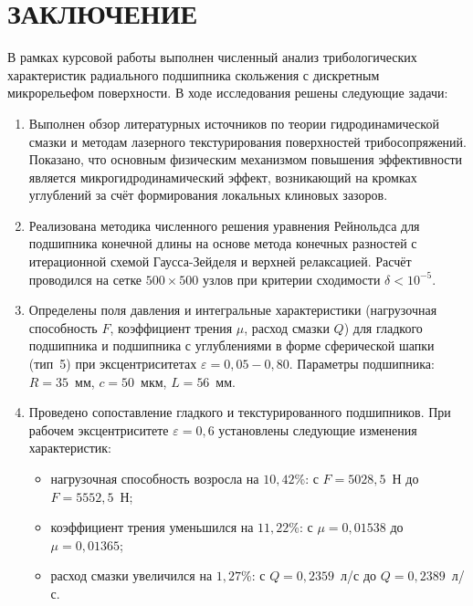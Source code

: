 \section*{ЗАКЛЮЧЕНИЕ}
{}

В рамках курсовой работы выполнен численный анализ трибологических характеристик радиального подшипника скольжения с дискретным микрорельефом поверхности. В ходе исследования решены следующие задачи:

\begin{enumerate}
    \item Выполнен обзор литературных источников по теории гидродинамической смазки и методам лазерного текстурирования поверхностей трибосопряжений. Показано, что основным физическим механизмом повышения эффективности является микрогидродинамический эффект, возникающий на кромках углублений за счёт формирования локальных клиновых зазоров.

    \item Реализована методика численного решения уравнения Рейнольдса для подшипника конечной длины на основе метода конечных разностей с итерационной схемой Гаусса-Зейделя и верхней релаксацией. Расчёт проводился на сетке $500 \times 500$ узлов при критерии сходимости $\delta < 10^{-5}$.

    \item Определены поля давления и интегральные характеристики (нагрузочная способность $F$, коэффициент трения $\mu$, расход смазки $Q$) для гладкого подшипника и подшипника с углублениями в форме сферической шапки (тип~5) при эксцентриситетах $\varepsilon = 0{,}05 - 0{,}80$. Параметры подшипника: $R = 35$~мм, $c = 50$~мкм, $L = 56$~мм.

    \item Проведено сопоставление гладкого и текстурированного подшипников. При рабочем эксцентриситете $\varepsilon = 0{,}6$ установлены следующие изменения характеристик:
    \begin{itemize}
        \item нагрузочная способность возросла на $10{,}42$\%: с $F = 5028{,}5$~Н до $F = 5552{,}5$~Н;
        \item коэффициент трения уменьшился на $11{,}22$\%: с $\mu = 0{,}01538$ до $\mu = 0{,}01365$;
        \item расход смазки увеличился на $1{,}27$\%: с $Q = 0{,}2359$~л/с до $Q = 0{,}2389$~л/с.
    \end{itemize}
\end{enumerate}

